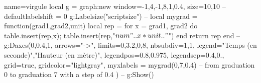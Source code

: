 \documentclass{standalone}
\begin{document}
\begin{luadraw}{name=virgule}
local g = graph:new{
  window={-1,4,-1,8,1,0.4},
  size={10,10}
  }
--
defaultlabelshift = 0
g:Labelsize("scriptsize")
--
local mygrad = function(grad1,grad2,unit)
    local rep = {}
    for x = grad1, grad2 do
        table.insert(rep,x); table.insert(rep,"$\\num{"..x*unit.."}$")
    end
    return rep
end
--
g:Daxes({0,0.4,1},
    {
        arrows="->",
        limits={{0,3.2},{0,8}},
        nbsubdiv={1,1},
        legend={"Temps (en seconde)","Hauteur (en mètre)"},
        legendpos={0.8,0.975},
        legendsep={0.4,0.},
        grid=true,
        gridcolor="lightgray",
        myxlabels = mygrad(0,7,0.4) -- from graduation 0 to graduation 7 with a step of 0.4
    })
--    
g:Show()
\end{luadraw}
\end{document}
